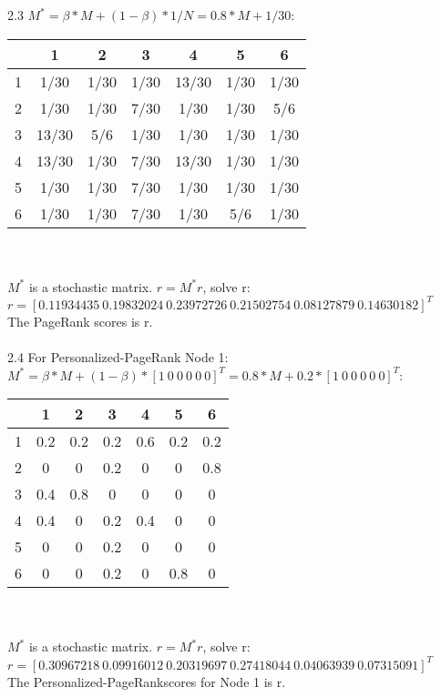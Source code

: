 \documentclass[11pt,a4paper,fleqn]{article}
\begin{document}
2.3 $M^* = \beta*M+(1-\beta)*1/N = 0.8*M+1/30$:\\
\begin{tabular}{c|cccccc}
&1&2&3&4&5&6\\
\hline
1&1/30&1/30&1/30&13/30&1/30&1/30\\
2&1/30&1/30&7/30&1/30&1/30&5/6\\
3&13/30&5/6&1/30&1/30&1/30&1/30\\
4&13/30&1/30&7/30&13/30&1/30&1/30\\
5&1/30&1/30&7/30&1/30&1/30&1/30\\
6&1/30&1/30&7/30&1/30&5/6&1/30\\
\end{tabular}\\ \\ 
$M^*$ is a stochastic matrix. $r=M^*r$, solve r: \\
$r=[0.11934435\  0.19832024\  0.23972726\  0.21502754\  0.08127879\  0.14630182]^T$\\
The PageRank scores is r.\\ \\
2.4 For Personalized-PageRank Node 1:\\
$M^* = \beta*M+(1-\beta)*[1\ 0\ 0\ 0\ 0\ 0]^T = 0.8*M+0.2*[1\ 0\ 0\ 0\ 0\ 0]^T$:\\
\begin{tabular}{c|cccccc}
&1&2&3&4&5&6\\
\hline
1&0.2&0.2&0.2&0.6&0.2&0.2\\
2&0&0&0.2&0&0&0.8\\
3&0.4&0.8&0&0&0&0\\
4&0.4&0&0.2&0.4&0&0\\
5&0&0&0.2&0&0&0\\
6&0&0&0.2&0&0.8&0\\
\end{tabular}\\ \\ 
$M^*$ is a stochastic matrix. $r=M^*r$, solve r: \\
$r=[ 0.30967218\  0.09916012\  0.20319697\  0.27418044\  0.04063939\  0.07315091]^T$\\
The Personalized-PageRankscores  for Node 1 is r.\\
\end{document}
